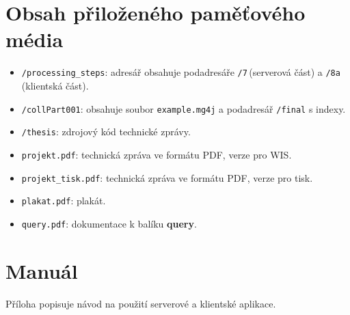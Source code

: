 
\chapter{Obsah přiloženého paměťového média}
\begin{itemize}
\item \texttt{/processing\_steps}: adresář obsahuje podadresáře \texttt{/7}\,(serverová část) a \texttt{/8a}\,(klientská část).
\item \texttt{/collPart001}: obsahuje soubor \texttt{example.mg4j} a podadresář \texttt{/final} s indexy. 
\item \texttt{/thesis}: zdrojový kód technické zprávy.
\item \texttt{projekt.pdf}: technická zpráva ve formátu PDF, verze pro WIS.
\item \texttt{projekt\_tisk.pdf}: technická zpráva ve formátu PDF, verze pro tisk.
\item \texttt{plakat.pdf}: plakát.
\item \texttt{query.pdf}: dokumentace k balíku \textbf{query}.
\end{itemize}

\chapter{Manuál}

Příloha popisuje návod na použití serverové a klientské aplikace.

